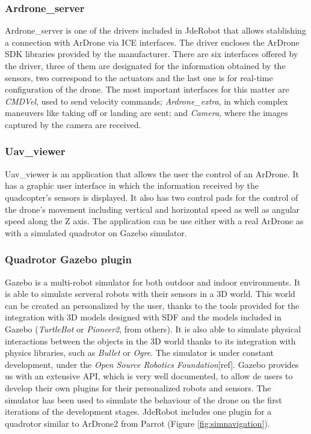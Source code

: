 \documentclass{styles/svproc}
\begin{document}
\subsubsection{Ardrone\_server}

	Ardrone\_server is one of the drivers included in JdeRobot that allows stablishing a connection with ArDrone via ICE interfaces. The driver encloses the ArDrone SDK libraries provided by the manufacturer. There are six interfaces offered by the driver, three of them are designated for the information obtained by the sensors, two correspond to the actuators and the last one is for real-time configuration of the drone. The most important interfaces for this matter are \textit{CMDVel}, used to send velocity commands; \textit{Ardrone\_extra}, in which complex maneuvers like taking off or landing are sent; and \textit{Camera}, where the images captured by the camera are received.

\subsubsection{Uav\_viewer}

	Uav\_viewer is an application that allows the user the control of an ArDrone. It has a graphic user interface in which the information received by the quadcopter's sensors is displayed. It also has two control pads for the control of the drone's movement including vertical and horizontal speed as well as angular speed along the Z axis. The application can be use either with a real ArDrone as with a simulated quadrotor on Gazebo simulator.

\subsubsection{Quadrotor Gazebo plugin}

	Gazebo is a multi-robot simulator for both outdoor and indoor environments. It is able to simulate serveral robots with their sensors in a 3D world. This world can be created an personalized by the user, thanks to the tools provided for the integration with 3D models designed with SDF and the models included in Gazebo (\textit{TurtleBot} or \textit{Pioneer2}, from others). It is also able to simulate physical interactions between the objects in the 3D world thanks to its integration with physics libraries, such as \textit{Bullet} or \textit{Ogre}. The simulator is under constant development, under the \textit{Open Source Robotics Foundation}[ref]. Gazebo provides us with an extensive API, which is very well documented, to allow de users to develop their own plugins for their personalized robots and sensors. The simulator has been used to simulate the behaviour of the drone on the first iterations of the development stages. JdeRobot includes one plugin for a quadrotor similar to ArDrone2 from Parrot (Figure \ref{fig:simnavigation}).
\end{document}
